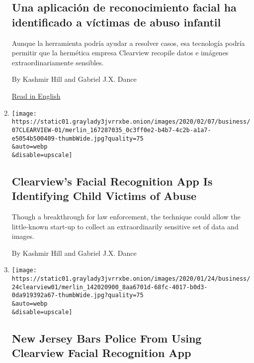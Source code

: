 \begin{enumerate}
  \hypertarget{una-aplicaciuxf3n-de-reconocimiento-facial-ha-identificado-a-vuxedctimas-de-abuso-infantil}{%
  \subsection{Una aplicación de reconocimiento facial ha identificado a
  víctimas de abuso
  infantil}\label{una-aplicaciuxf3n-de-reconocimiento-facial-ha-identificado-a-vuxedctimas-de-abuso-infantil}}

  Aunque la herramienta podría ayudar a resolver casos, esa tecnología
  podría permitir que la hermética empresa Clearview recopile datos e
  imágenes extraordinariamente sensibles.

  By Kashmir Hill and Gabriel J.X. Dance

  \href{https://www.nytimes3xbfgragh.onion/2020/02/07/business/clearview-facial-recognition-child-sexual-abuse.html}{Read
  in English}
\item
  \href{/2020/02/07/business/clearview-facial-recognition-child-sexual-abuse.html}{}

  \texttt{[image: https://static01.graylady3jvrrxbe.onion/images/2020/02/07/business/07CLEARVIEW-01/merlin\_167287035\_0c3ff0e2-b4b7-4c2b-a1a7-e5054b500409-thumbWide.jpg?quality=75\\\&auto=webp\\\&disable=upscale]}

  \hypertarget{clearviews-facial-recognition-app-is-identifying-child-victims-of-abuse}{%
  \subsection{Clearview's Facial Recognition App Is Identifying Child
  Victims of
  Abuse}\label{clearviews-facial-recognition-app-is-identifying-child-victims-of-abuse}}

  Though a breakthrough for law enforcement, the technique could allow
  the little-known start-up to collect an extraordinarily sensitive set
  of data and images.

  By Kashmir Hill and Gabriel J.X. Dance
\item
  \href{/2020/01/24/technology/clearview-ai-new-jersey.html}{}

  \texttt{[image: https://static01.graylady3jvrrxbe.onion/images/2020/01/24/business/24clearview01/merlin\_142020900\_8aa6701d-68fc-4017-b0d3-0da919392a67-thumbWide.jpg?quality=75\\\&auto=webp\\\&disable=upscale]}

  \hypertarget{new-jersey-bars-police-from-using-clearview-facial-recognition-app}{%
  \subsection{New Jersey Bars Police From Using Clearview Facial
  Recognition
  App}\label{new-jersey-bars-police-from-using-clearview-facial-recognition-app}}


\end{enumerate}
